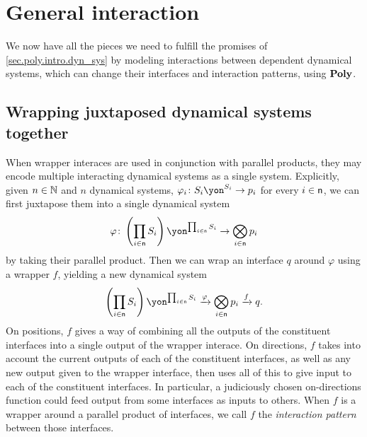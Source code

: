 \documentclass[Book-Poly]{subfiles}
\begin{document}

\section{General interaction}\label{sec.poly.dyn_sys.interact}

We now have all the pieces we need to fulfill the promises of \cref{sec.poly.intro.dyn_sys} by modeling interactions between dependent dynamical systems, which can change their interfaces and interaction patterns, using $\mathbf{Poly}$.

\subsection{Wrapping juxtaposed dynamical systems together}

When wrapper interaces are used in conjunction with parallel products, they may encode multiple interacting dynamical systems as a single system.
Explicitly, given $n\in\mathbb{N}$ and $n$ dynamical systems, $\varphi_i\colon S_i\yon^{S_i}\to p_i$ for every $i\in\mathsf{n}$, we can first juxtapose them into a single dynamical system
\[\varphi\colon \left(\prod_{i\in\ord{n}}S_i\right)\yon^{\prod_{i\in\ord{n}}S_i}\to\bigotimes_{i\in\ord{n}}p_i\]
by taking their parallel product.
Then we can wrap an interface $q$ around $\varphi$ using a wrapper $f$, yielding a new dynamical system
\[\left(\prod_{i\in\ord{n}}S_i\right)\yon^{\prod_{i\in\ord{n}}S_i}\To{\varphi}\bigotimes_{i\in\ord{n}}p_i\To{f}q.\]
On positions, $f$ gives a way of combining all the outputs of the constituent interfaces into a single output of the wrapper interace.
On directions, $f$ takes into account the current outputs of each of the constituent interfaces, as well as any new output given to the wrapper interface, then uses all of this to give input to each of the constituent interfaces.
In particular, a judiciously chosen on-directions function could feed output from some interfaces as inputs to others.
When $f$ is a wrapper around a parallel product of interfaces, we call $f$ the \emph{interaction pattern} between those interfaces.
\end{document}
